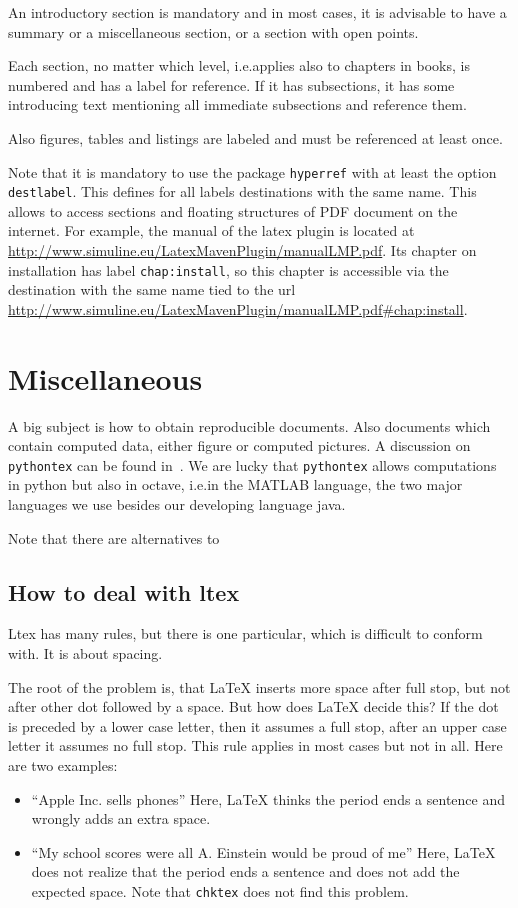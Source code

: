 \documentclass[a4paper,12pt]{article}
\begin{document}
An introductory section is mandatory and in most cases, 
it is advisable to have a summary or a miscellaneous section, 
or a section with open points. 

Each section, no matter which level, i.e.\@ applies also to chapters in books, 
is numbered and has a label for reference. 
If it has subsections, it has some introducing text mentioning all immediate subsections 
and reference them. 

Also figures, tables and listings are labeled and must be referenced at least once. 

Note that it is mandatory to use the package \texttt{hyperref} 
with at least the option \texttt{destlabel}. 
This defines for all labels destinations with the same name. 
This allows to access sections and floating structures 
of PDF document on the internet. 
For example, the manual of the latex plugin 
is located at \url{http://www.simuline.eu/LatexMavenPlugin/manualLMP.pdf}. 
Its chapter on installation has label \texttt{chap:install}, 
so this chapter is accessible 
via the destination with the same name 
tied to the url 
\url{http://www.simuline.eu/LatexMavenPlugin/manualLMP.pdf#chap:install}. 


\section{Miscellaneous}\label{sec:misc}

A big subject is how to obtain reproducible documents. 
Also documents which contain computed data, either figure or computed pictures. 
A discussion on \texttt{pythontex} can be found in~\cite{Poo15}. 
We are lucky that \texttt{pythontex} allows computations in python but also in octave, 
i.e.\@ in the MATLAB language,  
the two major languages we use besides our developing language java. 

Note that there are alternatives to 


\subsection{How to deal with ltex}\label{subsec:ltex}

Ltex has many rules, but there is one particular, which is difficult to conform with. 
It is about spacing. 

The root of the problem is, that \LaTeX{} inserts more space after full stop, 
but not after other dot followed by a space. 
But how does \LaTeX{} decide this? If the dot is preceded by a lower case letter, 
then it assumes a full stop, after an upper case letter it assumes no full stop. 
This rule applies in most cases but not in all. 
Here are two examples: 
%
\begin{itemize}
  \item ``Apple Inc. sells phones''%
  Here, \LaTeX{} thinks the period ends a sentence and wrongly adds an extra space.
  \item ``My school scores were all A. Einstein would be proud of me''
  Here, \LaTeX{} does not realize that the period ends a sentence 
  and does not add the expected space. 
  Note that \texttt{chktex} does not find this problem. 
\end{itemize}
\end{document}

